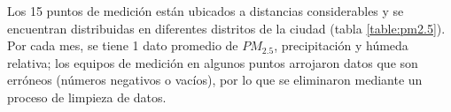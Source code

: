 \documentclass[a4paper,11pt]{article}
\begin{document}


Los 15 puntos de medición están ubicados a distancias considerables y se encuentran distribuidas en diferentes distritos de la ciudad (tabla \ref{table:pm2.5}). Por cada mes, se tiene 1 dato promedio de $PM_{2.5}$, precipitación y húmeda relativa; los equipos de medición en algunos puntos arrojaron datos que son erróneos (números negativos o vacíos), por lo que se eliminaron mediante un proceso de limpieza de datos. 
\end{document}
